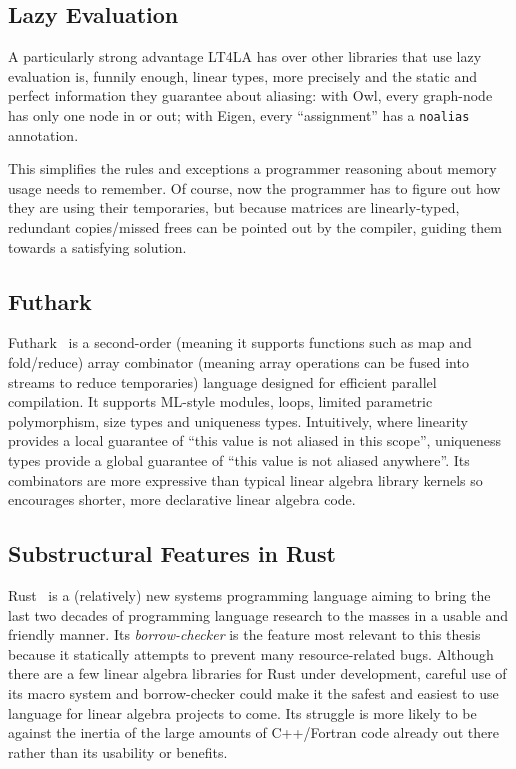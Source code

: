 \subsection{Lazy Evaluation}

A particularly strong advantage LT4LA has over other libraries that use lazy
evaluation is, funnily enough, linear types, more precisely and the static and
perfect information they guarantee about aliasing: with Owl, every graph-node
has only one node in or out; with Eigen, every ``assignment'' has a
\texttt{noalias} annotation.

This simplifies the rules and exceptions a programmer reasoning about memory
usage needs to remember. Of course, now the programmer has to figure out how
they are using their temporaries, but because matrices are linearly-typed,
redundant copies/missed frees can be pointed out by the compiler, guiding them
towards a satisfying solution.

\subsection{Futhark}

Futhark~\cite{futhark} is a second-order (meaning it supports functions such as
map and fold/reduce) array combinator (meaning array operations can be fused
into streams to reduce temporaries) language designed for efficient parallel
compilation. It supports ML-style modules, loops, limited parametric
polymorphism, size types and uniqueness types. Intuitively, where linearity
provides a local guarantee of ``this value is not aliased in this scope'',
uniqueness types provide a global guarantee of ``this value is not aliased
anywhere''. Its combinators are more expressive than typical linear algebra
library kernels so encourages shorter, more declarative linear algebra code.

\subsection{Substructural Features in Rust}

Rust~\cite{rust} is a (relatively) new systems programming language aiming to
bring the last two decades of programming language research to the masses in a
usable and friendly manner. Its \emph{borrow-checker} is the feature most
relevant to this thesis because it statically attempts to prevent many
resource-related bugs. Although there are a few linear algebra libraries for
Rust under development, careful use of its macro system and borrow-checker
could make it the safest and easiest to use language for linear algebra
projects to come. Its struggle is more likely to be against the inertia of the
large amounts of C++/Fortran code already out there rather than its usability
or benefits.

